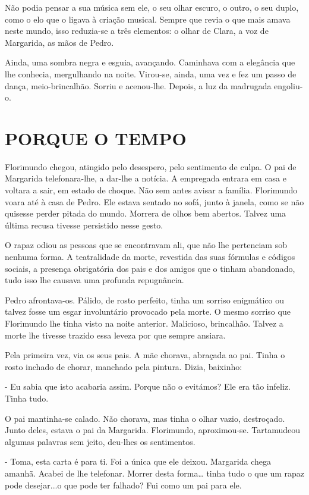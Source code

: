 Não podia pensar a sua música sem ele, o seu olhar escuro, o outro, o
seu duplo, como o elo que o ligava à criação musical. Sempre que revia o
que mais amava neste mundo, isso reduzia-se a três elementos: o olhar de
Clara, a voz de Margarida, as mãos de Pedro.

Ainda, uma sombra negra e esguia, avançando. Caminhava com a elegância
que lhe conhecia, mergulhando na noite. Virou-se, ainda, uma vez e fez
um passo de dança, meio-brincalhão. Sorriu e acenou-lhe. Depois, a luz
da madrugada engoliu-o.

\section{PORQUE O TEMPO}

Florimundo chegou, atingido pelo desespero, pelo sentimento de culpa. O
pai de Margarida telefonara-lhe, a dar-lhe a notícia. A empregada
entrara em casa e voltara a sair, em estado de choque. Não sem antes
avisar a família. Florimundo voara até à casa de Pedro. Ele estava
sentado no sofá, junto à janela, como se não quisesse perder pitada do
mundo. Morrera de olhos bem abertos. Talvez uma última recusa tivesse
persistido nesse gesto.

O rapaz odiou as pessoas que se encontravam ali, que não lhe pertenciam
sob nenhuma forma. A teatralidade da morte, revestida das suas fórmulas
e códigos sociais, a presença obrigatória dos pais e dos amigos que o
tinham abandonado, tudo isso lhe causava uma profunda repugnância.

Pedro afrontava-os. Pálido, de rosto perfeito, tinha um sorriso
enigmático ou talvez fosse um esgar involuntário provocado pela morte. O
mesmo sorriso que Florimundo lhe tinha visto na noite anterior.
Malicioso, brincalhão. Talvez a morte lhe tivesse trazido essa leveza
por que sempre ansiara.

Pela primeira vez, via os seus pais. A mãe chorava, abraçada ao pai.
Tinha o rosto inchado de chorar, manchado pela pintura. Dizia, baixinho:

- Eu sabia que isto acabaria assim. Porque não o evitámos? Ele era tão
infeliz. Tinha tudo.

O pai mantinha-se calado. Não chorava, mas tinha o olhar vazio,
destroçado. Junto deles, estava o pai da Margarida. Florimundo,
aproximou-se. Tartamudeou algumas palavras sem jeito, deu-lhes os
sentimentos.

- Toma, esta carta é para ti. Foi a única que ele deixou. Margarida
chega amanhã. Acabei de lhe telefonar. Morrer desta forma\ldots{} tinha
tudo o que um rapaz pode desejar...o que pode ter falhado? Fui como um
pai para ele.

